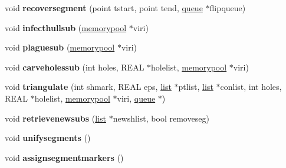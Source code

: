 \begin{DoxyCompactItemize}
\item 
\hypertarget{classtetgenmesh_a6084a9736d18a213d873c1f9b0d7468e}{void {\bfseries recoversegment} (point tstart, point tend, \hyperlink{classtetgenmesh_1_1queue}{queue} $\ast$flipqueue)}\label{classtetgenmesh_a6084a9736d18a213d873c1f9b0d7468e}

\item 
\hypertarget{classtetgenmesh_abba9ad7ef65beefd924586ffc87a0b3f}{void {\bfseries infecthullsub} (\hyperlink{classtetgenmesh_1_1memorypool}{memorypool} $\ast$viri)}\label{classtetgenmesh_abba9ad7ef65beefd924586ffc87a0b3f}

\item 
\hypertarget{classtetgenmesh_a353b5827a48b6a5a95ef1e3cbde3a982}{void {\bfseries plaguesub} (\hyperlink{classtetgenmesh_1_1memorypool}{memorypool} $\ast$viri)}\label{classtetgenmesh_a353b5827a48b6a5a95ef1e3cbde3a982}

\item 
\hypertarget{classtetgenmesh_aa44c50bafde2eaa75c67a7c6791d2841}{void {\bfseries carveholessub} (int holes, R\-E\-A\-L $\ast$holelist, \hyperlink{classtetgenmesh_1_1memorypool}{memorypool} $\ast$viri)}\label{classtetgenmesh_aa44c50bafde2eaa75c67a7c6791d2841}

\item 
\hypertarget{classtetgenmesh_a7ede4c6d8f74bcaa18c2889e1bb263cb}{void {\bfseries triangulate} (int shmark, R\-E\-A\-L eps, \hyperlink{classtetgenmesh_1_1list}{list} $\ast$ptlist, \hyperlink{classtetgenmesh_1_1list}{list} $\ast$conlist, int holes, R\-E\-A\-L $\ast$holelist, \hyperlink{classtetgenmesh_1_1memorypool}{memorypool} $\ast$viri, \hyperlink{classtetgenmesh_1_1queue}{queue} $\ast$)}\label{classtetgenmesh_a7ede4c6d8f74bcaa18c2889e1bb263cb}

\item 
\hypertarget{classtetgenmesh_a3e65ff45fe314e3da330009419069c2b}{void {\bfseries retrievenewsubs} (\hyperlink{classtetgenmesh_1_1list}{list} $\ast$newshlist, bool removeseg)}\label{classtetgenmesh_a3e65ff45fe314e3da330009419069c2b}

\item 
\hypertarget{classtetgenmesh_adcb0e0e582808c23829b42708a7596dc}{void {\bfseries unifysegments} ()}\label{classtetgenmesh_adcb0e0e582808c23829b42708a7596dc}

\item 
\hypertarget{classtetgenmesh_a2a40ecee47233e91d8c865f7ff4c7219}{void {\bfseries assignsegmentmarkers} ()}\label{classtetgenmesh_a2a40ecee47233e91d8c865f7ff4c7219}


\end{DoxyCompactItemize}
